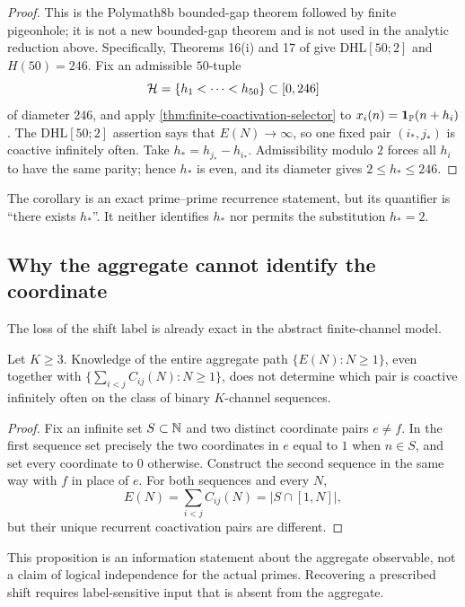 \begin{proof}
This is the Polymath8b bounded-gap theorem followed by finite pigeonhole;
it is not a new bounded-gap theorem and is not used in the analytic
reduction above.  Specifically, Theorems 16(i) and 17 of
\citet{Polymath2014} give
$\mathrm{DHL}[50;2]$ and $H(50)=246$.  Fix an admissible $50$-tuple
\[
 \mathcal H=\{h_1<\cdots<h_{50}\}\subset[0,246]
\]
of diameter $246$, and apply
\cref{thm:finite-coactivation-selector} to
$x_i(n)=\mathbf 1_{\mathbb P}(n+h_i)$.  The $\mathrm{DHL}[50;2]$ assertion says
that $E(N)\to\infty$, so one fixed pair $(i_*,j_*)$ is coactive infinitely
often.  Take $h_*=h_{j_*}-h_{i_*}$.  Admissibility modulo $2$ forces all
$h_i$ to have the same parity; hence $h_*$ is even, and its diameter gives
$2\le h_*\le246$.
\end{proof}

The corollary is an exact prime--prime recurrence statement, but its
quantifier is ``there exists $h_*$''.  It neither identifies $h_*$ nor
permits the substitution $h_*=2$.

\subsection{Why the aggregate cannot identify the coordinate}

The loss of the shift label is already exact in the abstract finite-channel
model.

\begin{proposition}
\label{prop:aggregate-nonidentifiability}
Let $K\ge3$.  Knowledge of the entire aggregate path
$\{E(N):N\ge1\}$, even together with
$\{\sum_{i<j}C_{ij}(N):N\ge1\}$, does not determine which pair is
coactive infinitely often on the class of binary $K$-channel sequences.
\end{proposition}

\begin{proof}
Fix an infinite set $S\subset\mathbb N$ and two distinct coordinate pairs
$e\ne f$.  In the first sequence set precisely the two coordinates in $e$
equal to $1$ when $n\in S$, and set every coordinate to $0$ otherwise.
Construct the second sequence in the same way with $f$ in place of $e$.
For both sequences and every $N$,
\[
 E(N)=\sum_{i<j}C_{ij}(N)=|S\cap[1,N]|,
\]
but their unique recurrent coactivation pairs are different.
\end{proof}

This proposition is an information statement about the aggregate
observable, not a claim of logical independence for the actual primes.
Recovering a prescribed shift requires label-sensitive input that is absent
from the aggregate.

